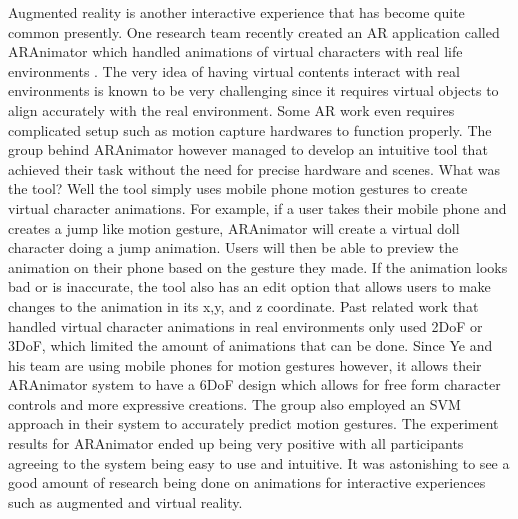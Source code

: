 \documentclass{article}
\begin{document}
Augmented reality is another interactive experience that has become quite common presently. One research team recently created an AR application called ARAnimator which handled animations of virtual characters with real life environments \cite{10.1145/3386569.3392404}. The very idea of having virtual contents interact with real environments is known to be very challenging since it requires virtual objects to align accurately with the real environment. Some AR work even requires complicated setup such as motion capture hardwares to function properly. The group behind ARAnimator however managed to develop an intuitive tool that achieved their task without the need for precise hardware and scenes. What was the tool? Well the tool simply uses mobile phone motion gestures to create virtual character animations. For example, if a user takes their mobile phone and creates a jump like motion gesture, ARAnimator will create a virtual doll character doing a jump animation. Users will then be able to preview the animation on their phone based on the gesture they made. If the animation looks bad or is inaccurate, the tool also has an edit option that allows users to make changes to the animation in its x,y, and z coordinate. Past related work that handled virtual character animations in real environments only used 2DoF or 3DoF, which limited the amount of animations that can be done. Since Ye and his team are using mobile phones for motion gestures however, it allows their ARAnimator system to have a 6DoF design which allows for free form character controls and more expressive creations. The group also employed an SVM approach in their system to accurately predict motion gestures. The experiment results for ARAnimator ended up being very positive with all participants agreeing to the system being easy to use and intuitive. It was astonishing to see a good amount of research being done on animations for interactive experiences such as augmented and virtual reality.




\end{document}

